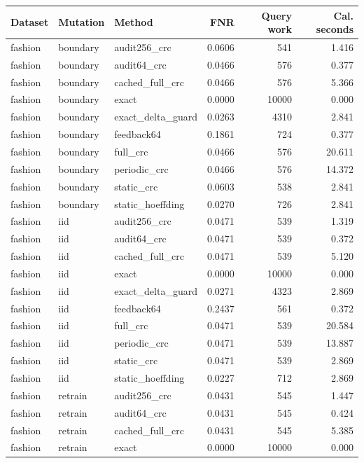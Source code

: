 \begin{tabular}{lllrrr}
\hline
Dataset & Mutation & Method & FNR & Query work & Cal. seconds \\
\hline
fashion & boundary & audit256\_crc & 0.0606 & 541 & 1.416 \\
fashion & boundary & audit64\_crc & 0.0466 & 576 & 0.377 \\
fashion & boundary & cached\_full\_crc & 0.0466 & 576 & 5.366 \\
fashion & boundary & exact & 0.0000 & 10000 & 0.000 \\
fashion & boundary & exact\_delta\_guard & 0.0263 & 4310 & 2.841 \\
fashion & boundary & feedback64 & 0.1861 & 724 & 0.377 \\
fashion & boundary & full\_crc & 0.0466 & 576 & 20.611 \\
fashion & boundary & periodic\_crc & 0.0466 & 576 & 14.372 \\
fashion & boundary & static\_crc & 0.0603 & 538 & 2.841 \\
fashion & boundary & static\_hoeffding & 0.0270 & 726 & 2.841 \\
fashion & iid & audit256\_crc & 0.0471 & 539 & 1.319 \\
fashion & iid & audit64\_crc & 0.0471 & 539 & 0.372 \\
fashion & iid & cached\_full\_crc & 0.0471 & 539 & 5.120 \\
fashion & iid & exact & 0.0000 & 10000 & 0.000 \\
fashion & iid & exact\_delta\_guard & 0.0271 & 4323 & 2.869 \\
fashion & iid & feedback64 & 0.2437 & 561 & 0.372 \\
fashion & iid & full\_crc & 0.0471 & 539 & 20.584 \\
fashion & iid & periodic\_crc & 0.0471 & 539 & 13.887 \\
fashion & iid & static\_crc & 0.0471 & 539 & 2.869 \\
fashion & iid & static\_hoeffding & 0.0227 & 712 & 2.869 \\
fashion & retrain & audit256\_crc & 0.0431 & 545 & 1.447 \\
fashion & retrain & audit64\_crc & 0.0431 & 545 & 0.424 \\
fashion & retrain & cached\_full\_crc & 0.0431 & 545 & 5.385 \\
fashion & retrain & exact & 0.0000 & 10000 & 0.000 \\

\end{tabular}
